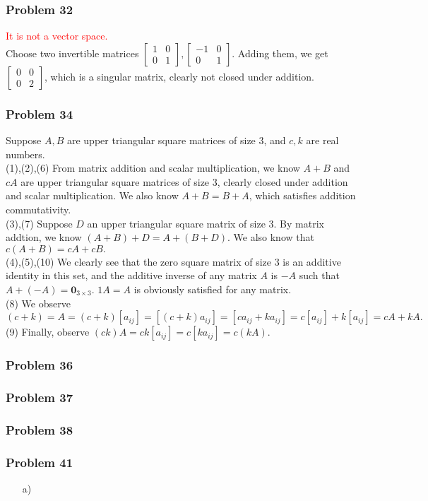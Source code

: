 \documentclass[a4paper,12pt]{article}
\begin{document}
\subsubsection*{Problem 32}
\textcolor{red}{It is not a vector space.}\\ Choose two invertible matrices $\begin{bmatrix}
  1 & 0 \\
  0 & 1
\end{bmatrix}, \begin{bmatrix}
  -1 & 0 \\
  0 & 1
\end{bmatrix}$. Adding them, we get $\begin{bmatrix}
  0 & 0 \\
  0 & 2
\end{bmatrix}$, which is a singular matrix, clearly not closed under addition.

\subsubsection*{Problem 34}
Suppose $A,B$ are upper triangular square matrices of size 3, and $c,k$ are real numbers.\\
(1),(2),(6) From matrix addition and scalar multiplication, we know $A+B$ and $cA$ are upper triangular square matrices of size 3, clearly closed under addition and scalar multiplication. We also know $A+B=B+A$, which satisfies addition commutativity.\\
(3),(7) Suppose $D$ an upper triangular square matrix of size 3. By matrix addtion, we know $(A+B)+D=A+(B+D)$. We also know that $c(A+B)=cA+cB.$\\
(4),(5),(10) We clearly see that the zero square matrix of size 3 is an additive identity in this set, and the additive inverse of any matrix $A$ is $-A$ such that $A+(-A)=\textbf{0}_{3\times 3}$. $1A=A$ is obviously satisfied for any matrix.\\
(8) We observe $(c+k)=A=(c+k)[a_{ij}]=[(c+k)a_{ij}]=[ca_{ij}+ka_{ij}]=c[a_{ij}]+k[a_{ij}]=cA+kA.$\\
(9) Finally, observe $(ck)A=ck[a_{ij}]=c[ka_{ij}]=c(kA).$
\subsubsection*{Problem 36}
\subsubsection*{Problem 37}
\subsubsection*{Problem 38}
\subsubsection*{Problem 41}
\begin{itemize}
    \item [a)]
\end{itemize}
\end{document}

